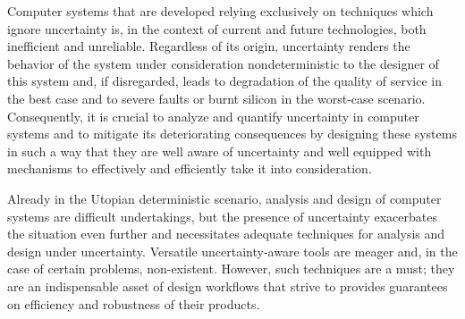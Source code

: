 Computer systems that are developed relying exclusively on techniques which
ignore uncertainty is, in the context of current and future technologies, both
inefficient and unreliable. Regardless of its origin, uncertainty renders the
behavior of the system under consideration nondeterministic to the designer of
this system and, if disregarded, leads to degradation of the quality of service
in the best case and to severe faults or burnt silicon in the worst-case
scenario. Consequently, it is crucial to analyze and quantify uncertainty in
computer systems and to mitigate its deteriorating consequences by designing
these systems in such a way that they are well aware of uncertainty and well
equipped with mechanisms to effectively and efficiently take it into
consideration.

Already in the Utopian deterministic scenario, analysis and design of computer
systems are difficult undertakings, but the presence of uncertainty exacerbates
the situation even further and necessitates adequate techniques for analysis and
design under uncertainty. Versatile uncertainty-aware tools are meager and, in
the case of certain problems, non-existent. However, such techniques are a must;
they are an indispensable asset of design workflows that strive to provides
guarantees on efficiency and robustness of their products.
